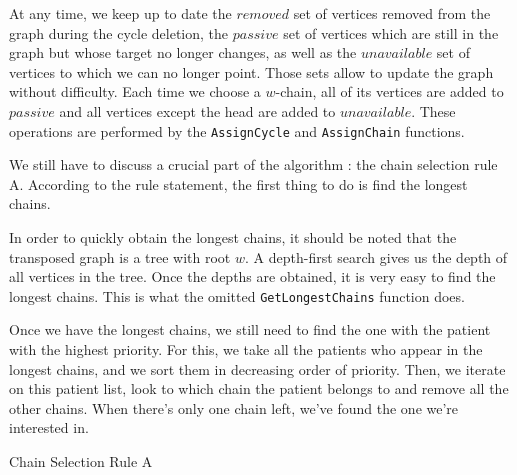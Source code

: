 \documentclass[english]{article}
\begin{document}
At any time, we keep up to date the $ removed $ set of vertices removed from the graph during the cycle deletion, the $ passive $ set of vertices which are still in the graph but whose target no longer changes, as well as the $ unavailable $ set of vertices to which we can no longer point. Those sets allow to update the graph without difficulty. Each time we choose a $w$-chain, all of its vertices are added to $ passive $ and all vertices except the head are added to $ unavailable $. These operations are performed by the \texttt{AssignCycle} and \texttt{AssignChain} functions. 

We still have to discuss a crucial part of the algorithm : the chain selection rule A. According to the rule statement, the first thing to do is find the longest chains.

In order to quickly obtain the longest chains, it should be noted that the transposed graph is a tree with root $ w $. A depth-first search gives us the depth of all vertices in the tree. Once the depths are obtained, it is very easy to find the longest chains. This is what the omitted \texttt{GetLongestChains} function does.

Once we have the longest chains, we still need to find the one with the patient with the highest priority. For this, we take all the patients who appear in the longest chains, and we sort them in decreasing order of priority. Then, we iterate on this patient list, look to which chain the patient belongs to and remove all the other chains. When there's only one chain left, we've found the one we're interested in.

\begin{algorithm*}[H]
    \label{ccaux}



    \caption{Chain Selection Rule A}

    
\end{algorithm*}
\end{document}
